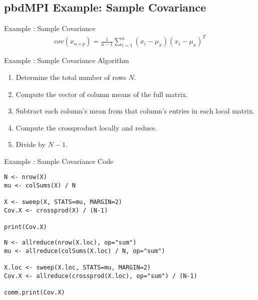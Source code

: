\subsection{pbdMPI Example: Sample Covariance}
\makesubcontentsslidessec


\begin{frame}
  \begin{block}{Example \countex :  Sample Covariance}\pause
  \begin{align*}
    cov(x_{n\times p}) = \frac{1}{n-1}\sum_{i=1}^n\left(x_i-\mu_x\right)\left(x_i-\mu_x\right)^T
  \end{align*}
  \end{block}
\end{frame}


\begin{frame}
  \begin{block}{Example \showex :  Sample Covariance Algorithm}\pause
    \begin{enumerate}
     \item Determine the total number of rows $N$.
     \item Compute the vector of column means of the full matrix.
     \item Subtract each column's mean from that column's entries in each local matrix.
     \item Compute the crossproduct locally and reduce.
     \item Divide by $N-1$.
    \end{enumerate}
  \end{block}
\end{frame}


\begin{frame}[fragile]
  \begin{exampleblock}{Example \showex :  Sample Covariance Code}\pause
\begin{lstlisting}[title=Serial Code]
N <- nrow(X)
mu <- colSums(X) / N

X <- sweep(X, STATS=mu, MARGIN=2)
Cov.X <- crossprod(X) / (N-1)

print(Cov.X)
\end{lstlisting}
  
\begin{lstlisting}[title=Parallel Code]
N <- allreduce(nrow(X.loc), op="sum")
mu <- allreduce(colSums(X.loc) / N, op="sum")

X.loc <- sweep(X.loc, STATS=mu, MARGIN=2)
Cov.X <- allreduce(crossprod(X.loc), op="sum") / (N-1)

comm.print(Cov.X)
\end{lstlisting}
  \end{exampleblock}
\end{frame}
